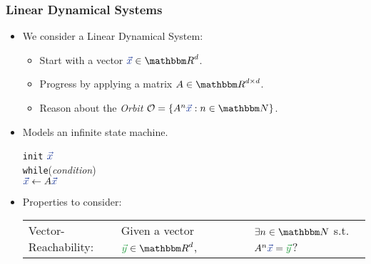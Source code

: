 \begin{frame}
	\frametitle{Linear Dynamical Systems}
	\begin{itemize}
		\item We consider a Linear Dynamical System:
		\onslide<+->
		\begin{itemize}[<+->]
			\item Start with a vector $\colInit{\vec{x}}\in \RR^d$.
			\item Progress by applying a matrix $A\in \RR^{d\times d}$.
			\item Reason about the {\em Orbit} ${\cal O}=\set{A^n \colInit{\vec{x}}:n\in \NN}$.
		\end{itemize}
	\item<+-> Models an infinite state machine.\\
	\hspace*{2.5cm}
		\begin{beamerboxesrounded}[upper=lowercolblue,lower=lowercolblue,shadow=true, width=3cm]{}
			\texttt{init} $\colInit{\vec{x}}$\\
			\texttt{while}({\em condition})\\
			\hspace*{0.5cm} $\colInit{\vec{x}}\leftarrow A\colInit{\vec{x}}$
		\end{beamerboxesrounded}
	\onslide<+->
	\item Properties to consider:
	{\footnotesize 
		\setlength{\tabcolsep}{1pt}
		\begin{tabular}{l l l l}
		\onslide<+->
		Vector-Reachability: & Given a vector $\colTarget{\vec{y}}\in \RR^d$, & &  $\exists n\in \NN$ s.t. $A^n \colInit{\vec{x}}=\colTarget{\vec{y}}$? \\ 

\end{tabular}}
\end{itemize}
\end{frame}
